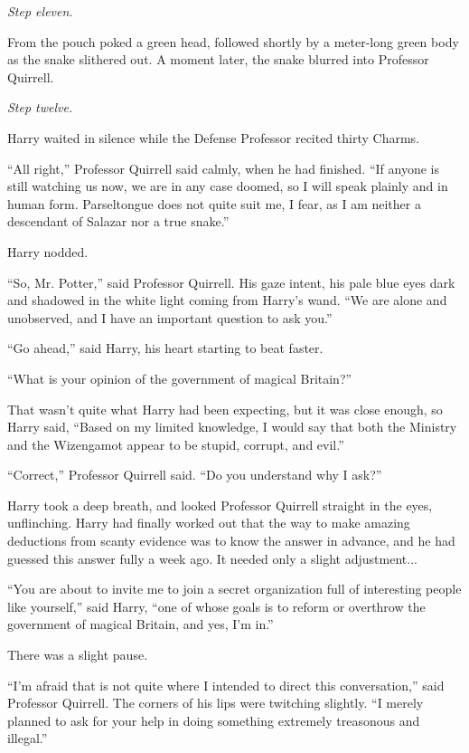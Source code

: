 \emph{Step eleven.}

From the pouch poked a green head, followed shortly by a meter-long
green body as the snake slithered out. A moment later, the snake blurred
into Professor Quirrell.

\emph{Step twelve.}

Harry waited in silence while the Defense Professor recited thirty
Charms.

``All right,'' Professor Quirrell said calmly, when he had finished.
``If anyone is still watching us now, we are in any case doomed, so I
will speak plainly and in human form. Parseltongue does not quite suit
me, I fear, as I am neither a descendant of Salazar nor a true snake.''

Harry nodded.

``So, Mr. Potter,'' said Professor Quirrell. His gaze intent, his pale
blue eyes dark and shadowed in the white light coming from Harry's wand.
``We are alone and unobserved, and I have an important question to ask
you.''

``Go ahead,'' said Harry, his heart starting to beat faster.

``What is your opinion of the government of magical Britain?''

That wasn't quite what Harry had been expecting, but it was close
enough, so Harry said, ``Based on my limited knowledge, I would say that
both the Ministry and the Wizengamot appear to be stupid, corrupt, and
evil.''

``Correct,'' Professor Quirrell said. ``Do you understand why I ask?''

Harry took a deep breath, and looked Professor Quirrell straight in the
eyes, unflinching. Harry had finally worked out that the way to make
amazing deductions from scanty evidence was to know the answer in
advance, and he had guessed this answer fully a week ago. It needed only
a slight adjustment...

``You are about to invite me to join a secret organization full of
interesting people like yourself,'' said Harry, ``one of whose goals is
to reform or overthrow the government of magical Britain, and yes, I'm
in.''

There was a slight pause.

``I'm afraid that is not quite where I intended to direct this
conversation,'' said Professor Quirrell. The corners of his lips were
twitching slightly. ``I merely planned to ask for your help in doing
something extremely treasonous and illegal.''

